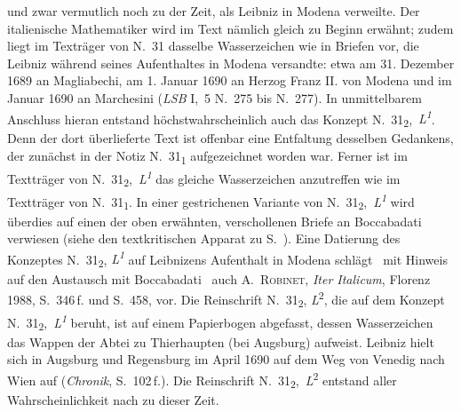 und zwar vermutlich noch zu der Zeit, als Leibniz in Modena verweilte.
Der italienische Mathematiker wird im Text nämlich gleich zu Beginn erwähnt;
zudem liegt im Texträger von N.~31 dasselbe Wasserzeichen wie in Briefen vor,
die Leibniz während seines Aufenthaltes in Modena versandte:
etwa am 31. Dezember 1689 an Magliabechi,
am 1. Januar 1690 an Herzog Franz II. von Modena%
\protect{}
und im Januar 1690 an Marchesini (\textit{LSB} I,~5 N.~275 bis N.~277).
\newline%
\indent%
In unmittelbarem Anschluss hieran entstand höchstwahrscheinlich auch das Konzept N.~31\textsubscript{2},~\textit{L\textsuperscript{1}}.
Denn der dort überlieferte Text ist offenbar eine Entfaltung desselben Gedankens,
der zunächst in der Notiz N.~31\textsubscript{1} aufgezeichnet worden war.
Ferner ist im Textträger von N.~31\textsubscript{2},~\textit{L\textsuperscript{1}} das gleiche Wasserzeichen anzutreffen
wie im Textträger von N.~31\textsubscript{1}.
In einer gestrichenen Variante von N.~31\textsubscript{2},~\textit{L\textsuperscript{1}} wird überdies auf einen der oben erwähnten,
verschollenen Briefe an Boccabadati verwiesen
(siehe den textkritischen Apparat zu S.~).
Eine Datierung des Konzeptes N.~31\textsubscript{2}, \textit{L\textsuperscript{1}} auf Leibnizens Aufenthalt in Modena schlägt \textendash\ mit Hinweis auf den Austausch mit Boccabadati \textendash\ auch \cite{01240}A.~\textsc{Robinet}, \textit{Iter Italicum}, Florenz 1988, S.~346\,f. und S.~458, vor.
\newline%
\indent%
Die Reinschrift N.~31\textsubscript{2}, \textit{L}\textsuperscript{2}, die auf dem Konzept N.~31\textsubscript{2},~\textit{L\textsuperscript{1}} beruht, ist auf einem Papierbogen abgefasst, dessen Wasserzeichen das Wappen der Abtei zu Thierhaupten\protect{} (bei Augsburg) %
aufweist.
Leibniz hielt sich in Augsburg\protect{} und Regensburg\protect{} im April 1690 auf dem Weg von Venedig\protect{} nach Wien\protect{} auf (\textit{Chronik}, S.~102\,f.).\cite{01236}
Die Reinschrift N.~31\textsubscript{2},~\textit{L}\textsuperscript{2} entstand aller Wahrscheinlichkeit nach zu dieser Zeit.
\pend
%
\newpage %
\normalsize
{}%
\frenchspacing%
%